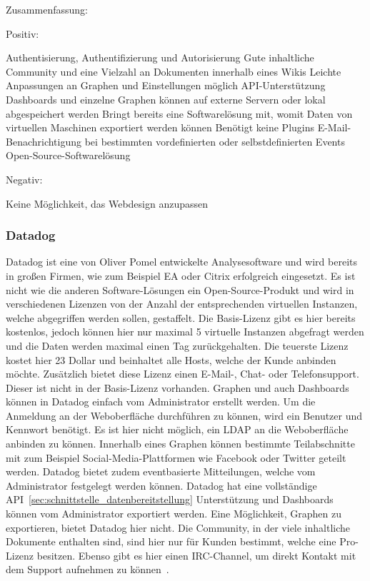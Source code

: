 Zusammenfassung:

Positiv:

\begin{outline}
  \1 Authentisierung, Authentifizierung und Autorisierung
  \1 Gute inhaltliche Community und eine Vielzahl an Dokumenten innerhalb
  eines Wikis
  \1 Leichte Anpassungen an Graphen und Einstellungen möglich
  \1 API-Unterstützung
  \1 Dashboards und einzelne Graphen können auf externe Servern oder lokal
  abgespeichert werden
  \1 Bringt bereits eine Softwarelösung mit, womit Daten von virtuellen
  Maschinen exportiert werden können
  \1 Benötigt keine Plugins
  \1 E-Mail-Benachrichtigung bei bestimmten vordefinierten oder
  selbstdefinierten Events
  \1 Open-Source-Softwarelösung
\end{outline}

Negativ:

\begin{outline}
  \1 Keine Möglichkeit, das Webdesign anzupassen
\end{outline}

\subsubsection{Datadog}
\label{subsubsec:datadog}
Datadog ist eine von Oliver Pomel entwickelte Analysesoftware und wird bereits
in großen Firmen, wie zum Beispiel EA oder Citrix erfolgreich eingesetzt. Es
ist nicht wie die anderen Software-Lösungen ein Open-Source-Produkt und wird in
verschiedenen Lizenzen von der Anzahl der entsprechenden virtuellen Instanzen,
welche abgegriffen werden sollen, gestaffelt. Die Basis-Lizenz gibt es hier
bereits kostenlos, jedoch können hier nur maximal 5 virtuelle Instanzen
abgefragt werden und die Daten werden maximal einen Tag zurückgehalten. Die
teuerste Lizenz kostet hier 23 Dollar und beinhaltet alle Hosts, welche der
Kunde anbinden möchte. Zusätzlich bietet diese Lizenz einen E-Mail-, Chat- oder
Telefonsupport. Dieser ist nicht in der Basis-Lizenz vorhanden. Graphen und
auch Dashboards können in Datadog einfach vom Administrator erstellt werden. Um
die Anmeldung an der Weboberfläche durchführen zu können, wird ein Benutzer und
Kennwort benötigt. Es ist hier nicht möglich, ein LDAP an die Weboberfläche
anbinden zu können. Innerhalb eines Graphen können bestimmte Teilabschnitte mit
zum Beispiel Social-Media-Plattformen wie Facebook oder Twitter geteilt werden.
Datadog bietet zudem eventbasierte Mitteilungen, welche vom Administrator
festgelegt werden können. Datadog hat eine vollständige
API~\ref{sec:schnittstelle_datenbereitstellung} Unterstützung und Dashboards
können vom Administrator exportiert werden. Eine Möglichkeit, Graphen zu
exportieren, bietet Datadog hier nicht. Die Community, in der viele inhaltliche
Dokumente enthalten sind, sind hier nur für Kunden bestimmt, welche eine
Pro-Lizenz besitzen. Ebenso gibt es hier einen \gls{IRC-Channel}, um direkt
Kontakt mit dem Support aufnehmen zu können~\cite{datadog}.

